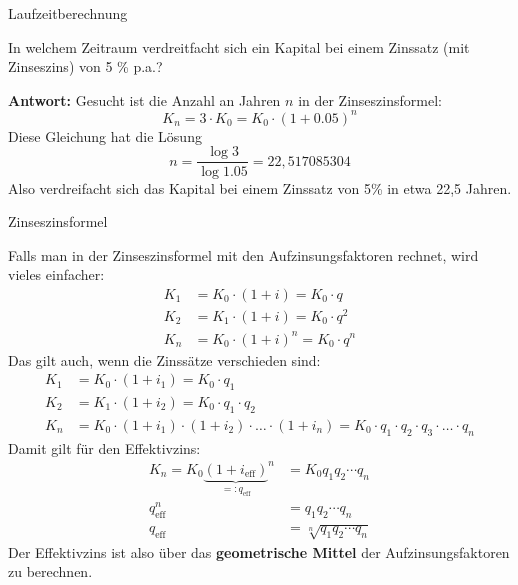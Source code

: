 \begin{frame}{Laufzeitberechnung}
	\begin{example}
		In welchem Zeitraum verdreitfacht sich ein Kapital bei einem Zinssatz (mit Zinseszins) von 5 \% p.a.?
		
		\textbf{Antwort:} Gesucht ist die Anzahl an Jahren $n$ in der Zinseszinsformel:
		\[
			K_{n} = 3 \cdot K_{0} = K_{0} \cdot \left( 1+0.05 \right)^{n}
		\]
		Diese Gleichung hat die Lösung
		\[
			n = \frac{\log 3}{\log 1.05} = 22,517085304
		\]
		Also verdreifacht sich das Kapital bei einem Zinssatz von 5\% in etwa 22,5 Jahren.
	\end{example}
\end{frame}

\begin{frame}{Zinseszinsformel}
{\footnotesize 	\begin{bemerkung}
		Falls man in der Zinseszinsformel mit den Aufzinsungsfaktoren rechnet, wird vieles einfacher:
		\begin{align*}
			K_{1} & = K_{0} \cdot (1+i) = K_{0} \cdot q \\
			K_{2} & = K_{1} \cdot (1+i) = K_{0} \cdot q^{2} \\
			K_{n} & = K_{0} \cdot (1+i)^{n} = K_{0} \cdot q^{n}
 		\end{align*}
 		Das gilt auch, wenn die Zinssätze verschieden sind:
		\begin{align*}
		K_{1} & = K_{0} \cdot (1+i_{1}) = K_{0} \cdot q_{1} \\
		K_{2} & = K_{1} \cdot (1+i_{2}) = K_{0} \cdot q_{1} \cdot q_{2} \\
		K_{n} & = K_{0} \cdot (1+i_{1}) \cdot (1+i_{2}) \cdot \ldots \cdot (1+i_{n}) = K_{0} \cdot q_{1} \cdot q_{2} \cdot q_{3} \cdot \ldots \cdot q_{n}
		\end{align*}
		Damit gilt für den Effektivzins:
		\begin{align*}
		K_{n} = K_{0} \underset{=: q_{\text{eff}}}{\underbrace{(1 + i_{\text{eff}})}}^{n} & = K_{0} q_{1} q_{2} \cdots q_{n} \\
		q_{\text{eff}}^{n} & = q_{1} q_{2} \cdots q_{n} \\
		q_{\text{eff}} & = \sqrt[n]{q_{1} q_{2} \cdots q_{n}}
		\end{align*}
		Der Effektivzins ist also über das \textbf{geometrische Mittel} der Aufzinsungsfaktoren zu berechnen.
	\end{bemerkung}
}\end{frame}

